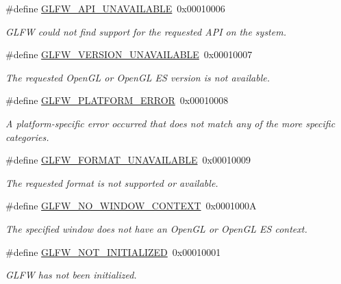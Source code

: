 \begin{DoxyCompactItemize}
\#define \hyperlink{group__errors_ga56882b290db23261cc6c053c40c2d08e}{G\+L\+F\+W\+\_\+\+A\+P\+I\+\_\+\+U\+N\+A\+V\+A\+I\+L\+A\+B\+LE}~0x00010006
\begin{DoxyCompactList}\small\item\em G\+L\+FW could not find support for the requested A\+PI on the system. \end{DoxyCompactList}\item 
\#define \hyperlink{group__errors_gad16c5565b4a69f9c2a9ac2c0dbc89462}{G\+L\+F\+W\+\_\+\+V\+E\+R\+S\+I\+O\+N\+\_\+\+U\+N\+A\+V\+A\+I\+L\+A\+B\+LE}~0x00010007
\begin{DoxyCompactList}\small\item\em The requested Open\+GL or Open\+GL ES version is not available. \end{DoxyCompactList}\item 
\#define \hyperlink{group__errors_gad44162d78100ea5e87cdd38426b8c7a1}{G\+L\+F\+W\+\_\+\+P\+L\+A\+T\+F\+O\+R\+M\+\_\+\+E\+R\+R\+OR}~0x00010008
\begin{DoxyCompactList}\small\item\em A platform-\/specific error occurred that does not match any of the more specific categories. \end{DoxyCompactList}\item 
\#define \hyperlink{group__errors_ga196e125ef261d94184e2b55c05762f14}{G\+L\+F\+W\+\_\+\+F\+O\+R\+M\+A\+T\+\_\+\+U\+N\+A\+V\+A\+I\+L\+A\+B\+LE}~0x00010009
\begin{DoxyCompactList}\small\item\em The requested format is not supported or available. \end{DoxyCompactList}\item 
\#define \hyperlink{group__errors_gacff24d2757da752ae4c80bf452356487}{G\+L\+F\+W\+\_\+\+N\+O\+\_\+\+W\+I\+N\+D\+O\+W\+\_\+\+C\+O\+N\+T\+E\+XT}~0x0001000A
\begin{DoxyCompactList}\small\item\em The specified window does not have an Open\+GL or Open\+GL ES context. \end{DoxyCompactList}\item 
\#define \hyperlink{group__errors_ga2374ee02c177f12e1fa76ff3ed15e14a}{G\+L\+F\+W\+\_\+\+N\+O\+T\+\_\+\+I\+N\+I\+T\+I\+A\+L\+I\+Z\+ED}~0x00010001
\begin{DoxyCompactList}\small\item\em G\+L\+FW has not been initialized. \end{DoxyCompactList}\item 

\end{DoxyCompactItemize}

